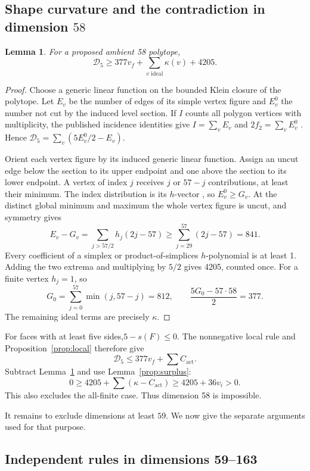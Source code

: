\documentclass[11pt]{article}
\newtheorem{lemma}[theorem]{Lemma}
\theoremstyle{remark}\newtheorem{remark}[theorem]{Remark}
\numberwithin{equation}{section}
\newcommand{\Dfive}{\mathcal D_5}
\begin{document}
\subsection[Shape curvature and the contradiction in dimension 58]{Shape curvature and the contradiction in dimension $58$}
\begin{lemma}\label{lem:shape}For a proposed ambient 58 polytope,
\[
 \Dfive\ge377v_f+\sum_{v\text{ ideal}}\kappa(v)+4205.
\]
\end{lemma}
\begin{proof}
Choose a generic linear function on the bounded Klein closure of
the polytope. Let $E_v$ be the number of edges of its simple vertex
figure and $E_v^0$ the number not cut by the induced level section.
If $I$ counts all polygon vertices with multiplicity, the published
incidence identities give $I=\sum_vE_v$ and
 $2f_2=\sum_vE_v^0$ \cite[Theorem~9]{Khovanskii}. Hence
 $\Dfive=\sum_v(5E_v^0/2-E_v)$.

Orient each vertex figure by its induced generic linear function.
Assign an uncut edge below the section to its upper endpoint and
one above the section to its lower endpoint. A vertex of index $j$
receives $j$ or $57-j$ contributions, at least their minimum.
The index distribution is its $h$-vector
\cite[Theorems~2 and~6]{Khovanskii}, so $E_v^0\ge G_v$.
At the distinct global minimum and maximum the whole
vertex figure is uncut, and symmetry gives
 \[
 E_v-G_v=\sum_{j>57/2}h_j(2j-57)\ge\sum_{j=29}^{57}(2j-57)=841.
\]
Every coefficient of a simplex or product-of-simplices $h$-polynomial is
at least 1. Adding the two extrema and multiplying by $5/2$ gives 4205,
counted once. For a finite vertex $h_j=1$, so
 \[
 G_0=\sum_{j=0}^{57}\min(j,57-j)=812,
 \qquad\frac{5G_0-57\cdot58}{2}=377.
\]
The remaining ideal terms are precisely $\kappa$.
\end{proof}

For faces with at least five sides,$5-s(F)\le0$. The nonnegative local
rule and Proposition~\ref{prop:local} therefore give
 \[
 \Dfive\le377v_f+\sum C_{\mathrm{act}}.
\]
Subtract Lemma~\ref{lem:shape} and use Lemma~\ref{prop:surplus}:
\[
 0\ge4205+\sum(\kappa-C_{\mathrm{act}})\ge4205+36v_i>0.
\]
This also excludes the all-finite case. Thus dimension 58 is impossible.

It remains to exclude dimensions at least $59$. We now give the separate
arguments used for that purpose.


\subsection{Independent rules in dimensions 59--163}
\end{document}
